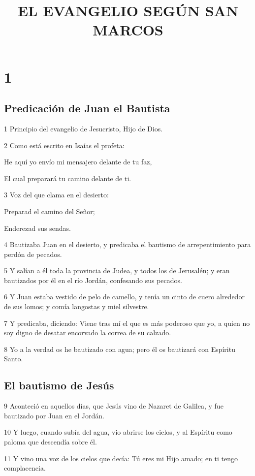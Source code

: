 
\title{EL EVANGELIO SEGÚN SAN MARCOS}

\chapter{1}

\section*{Predicación de Juan el Bautista}

\par 1 Principio del evangelio de Jesucristo, Hijo de Dios.
\par 2 Como está escrito en Isaías el profeta:
\par He aquí yo envío mi mensajero delante de tu faz,
\par El cual preparará tu camino delante de ti.
\par 3 Voz del que clama en el desierto:
\par Preparad el camino del Señor;
\par Enderezad sus sendas.
\par 4 Bautizaba Juan en el desierto, y predicaba el bautismo de arrepentimiento para perdón de pecados.
\par 5 Y salían a él toda la provincia de Judea, y todos los de Jerusalén; y eran bautizados por él en el río Jordán, confesando sus pecados.
\par 6 Y Juan estaba vestido de pelo de camello, y tenía un cinto de cuero alrededor de sus lomos; y comía langostas y miel silvestre.
\par 7 Y predicaba, diciendo: Viene tras mí el que es más poderoso que yo, a quien no soy digno de desatar encorvado la correa de su calzado.
\par 8 Yo a la verdad os he bautizado con agua; pero él os bautizará con Espíritu Santo.

\section*{El bautismo de Jesús}

\par 9 Aconteció en aquellos días, que Jesús vino de Nazaret de Galilea, y fue bautizado por Juan en el Jordán.
\par 10 Y luego, cuando subía del agua, vio abrirse los cielos, y al Espíritu como paloma que descendía sobre él.
\par 11 Y vino una voz de los cielos que decía: Tú eres mi Hijo amado; en ti tengo complacencia.


